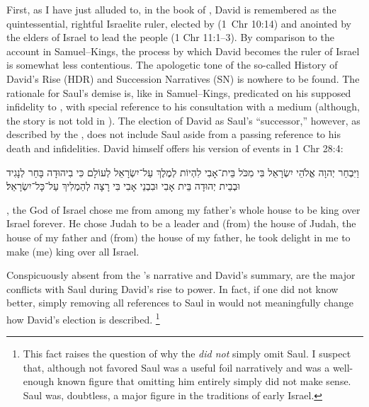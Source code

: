 First, as I have just alluded to, in the book of \chronicles, David is remembered as the quintessential, rightful Israelite ruler, elected by \yahweh (1~Chr 10:14) and anointed by the elders of Israel to lead the people (1 Chr 11:1--3). By comparison to the account in Samuel--Kings, the process by which David becomes the ruler of Israel is somewhat less contentious. The apologetic tone of the so-called History of David's Rise (HDR) and Succession Narratives (SN) is nowhere to be found. The rationale for Saul's demise is, like in Samuel--Kings, predicated on his supposed infidelity to \yahweh, with special reference to his consultation with a medium (although, the story is not told in \chronicles). The election of David as Saul's ``successor,'' however, as described by the \chronicler, does not include Saul aside from a passing reference to his death and infidelities. David himself offers his version of events in 1 Chr 28:4:
\begin{hebrewtext}
    וַיִּבְחַר יְהוָה אֱלֹהֵי יִשְׂרָאֵל בִּי מִכֹּל בֵּית־אָבִי לִהְיוֹת לְמֶלֶךְ עַל־יִשְׂרָאֵל לְעוֹלָם כִּי בִיהוּדָה בָּחַר לְנָגִיד וּבְבֵית יְהוּדָה בֵּית אָבִי וּבִבְנֵי אָבִי בִּי רָצָה לְהַמְלִיךְ עַל־כָּל־יִשְׂרָאֵל׃ 
\end{hebrewtext}
\begin{translation}
    \yahweh, the God of Israel chose me from among my father's whole house to be king over Israel forever. He chose Judah to be a leader and (from) the house of Judah, the house of my father and (from) the house of my father, he took delight in me to make (me) king over all Israel.
\end{translation}
\noindent
Conspicuously absent from the \chronicler's narrative and David's summary, are the major conflicts with Saul during David's rise to power. In fact, if one did not know better, simply removing all references to Saul in \chronicles would not meaningfully change how David's election is described.%
    \footnote{This fact raises the question of why the \chronicler \emph{did not} simply omit Saul. I suspect that, although not favored Saul was a useful foil narratively and was a well-enough known figure that omitting him entirely simply did not make sense. Saul was, doubtless, a major figure in the traditions of early Israel.}

